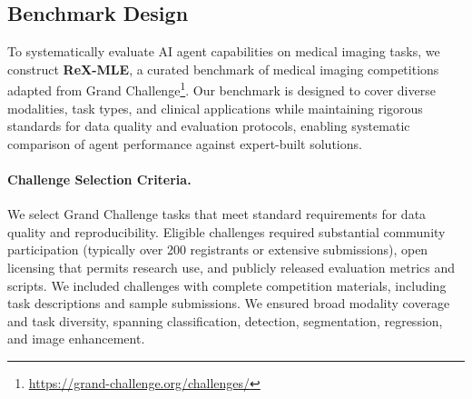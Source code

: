 \documentclass{midl} %
\begin{document}
\subsection{Benchmark Design}

To systematically evaluate AI agent capabilities on medical imaging tasks, we construct \textbf{ReX-MLE}, a curated benchmark of medical imaging competitions adapted from Grand Challenge\footnote{\url{https://grand-challenge.org/challenges/}}. Our benchmark is designed to cover diverse modalities, task types, and clinical applications while maintaining rigorous standards for data quality and evaluation protocols, enabling systematic comparison of agent performance against expert-built solutions.

\paragraph{Challenge Selection Criteria.}
We select Grand Challenge tasks that meet standard requirements for data quality and reproducibility. 
Eligible challenges required substantial community participation (typically over 200 registrants or extensive submissions), open licensing that permits research use, and publicly released evaluation metrics and scripts. We included challenges with complete competition materials, including task descriptions and sample submissions. We ensured broad modality coverage and task diversity, spanning classification, detection, segmentation, regression, and image enhancement.


\end{document}
